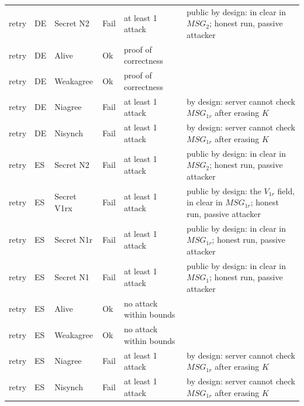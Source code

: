 \begin{table}[!t]
\begin{tabular}{llp{2.6cm}lp{2.6cm}p{5.6cm}}
retry & DE & Secret N2 & Fail & at least 1 attack & public by design: in clear in $MSG_2$; honest run, passive attacker \\
retry & DE & Alive & Ok & proof of correctness &  \\
retry & DE & Weakagree & Ok & proof of correctness &  \\
retry & DE & Niagree & Fail & at least 1 attack & by design: server cannot check $MSG_{1r}$ after erasing $K$ \\
retry & DE & Nisynch & Fail & at least 1 attack & by design: server cannot check $MSG_{1r}$ after erasing $K$ \\
retry & ES & Secret N2 & Fail & at least 1 attack & public by design: in clear in $MSG_2$; honest run, passive attacker \\
retry & ES & Secret V1rx & Fail & at least 1 attack & public by design: the $V_{1r}$ field, in clear in $MSG_{1r}$; honest run, passive attacker \\
retry & ES & Secret N1r & Fail & at least 1 attack & public by design: in clear in $MSG_{1r}$; honest run, passive attacker \\
retry & ES & Secret N1 & Fail & at least 1 attack & public by design: in clear in $MSG_1$; honest run, passive attacker \\
retry & ES & Alive & Ok & no attack within bounds &  \\
retry & ES & Weakagree & Ok & no attack within bounds &  \\
retry & ES & Niagree & Fail & at least 1 attack & by design: server cannot check $MSG_{1r}$ after erasing $K$ \\
retry & ES & Nisynch & Fail & at least 1 attack & by design: server cannot check $MSG_{1r}$ after erasing $K$ \\
\bottomrule
\end{tabular}
\end{table}
